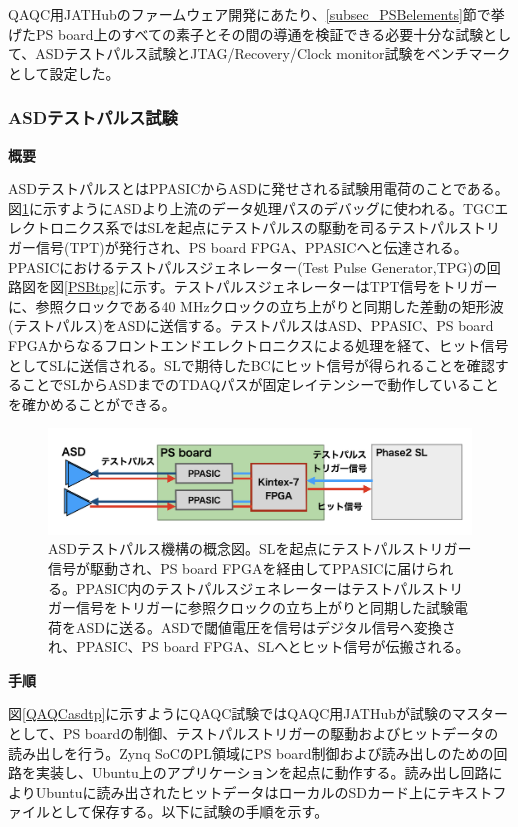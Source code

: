 QAQC用JATHubのファームウェア開発にあたり、\ref{subsec_PSBelements}節で挙げたPS board上のすべての素子とその間の導通を検証できる必要十分な試験として、ASDテストパルス試験とJTAG/Recovery/Clock monitor試験をベンチマークとして設定した。

\subsubsection{ASDテストパルス試験}
\label{subsubsec_testpulse}
\textbf{概要}\par
ASDテストパルスとはPPASICからASDに発せされる試験用電荷のことである。
図\ref{PSBasdtp}に示すようにASDより上流のデータ処理パスのデバッグに使われる。TGCエレクトロニクス系ではSLを起点にテストパルスの駆動を司るテストパルストリガー信号(TPT)が発行され、PS board FPGA、PPASICへと伝達される。PPASICにおけるテストパルスジェネレーター(Test Pulse Generator,TPG)の回路図を図\ref{PSBtpg}に示す。テストパルスジェネレーターはTPT信号をトリガーに、参照クロックである40 MHzクロックの立ち上がりと同期した差動の矩形波(テストパルス)をASDに送信する。テストパルスはASD、PPASIC、PS board FPGAからなるフロントエンドエレクトロニクスによる処理を経て、ヒット信号としてSLに送信される。SLで期待したBCにヒット信号が得られることを確認することでSLからASDまでのTDAQパスが固定レイテンシーで動作していることを確かめることができる。
\baselineskip
\begin{figure} 
\centering
\includegraphics[width=16cm]{fig/PSBasdtp.png}
\caption[ASDテストパルスの概念図]{ASDテストパルス機構の概念図。SLを起点にテストパルストリガー信号が駆動され、PS board FPGAを経由してPPASICに届けられる。PPASIC内のテストパルスジェネレーターはテストパルストリガー信号をトリガーに参照クロックの立ち上がりと同期した試験電荷をASDに送る。ASDで閾値電圧を信号はデジタル信号へ変換され、PPASIC、PS board FPGA、SLへとヒット信号が伝搬される。}
\label{PSBasdtp}
\end{figure}

\textbf{手順}\par
図\ref{QAQCasdtp}に示すようにQAQC試験ではQAQC用JATHubが試験のマスターとして、PS boardの制御、テストパルストリガーの駆動およびヒットデータの読み出しを行う。Zynq SoCのPL領域にPS board制御および読み出しのための回路を実装し、Ubuntu上のアプリケーションを起点に動作する。読み出し回路によりUbuntuに読み出されたヒットデータはローカルのSDカード上にテキストファイルとして保存する。以下に試験の手順を示す。


